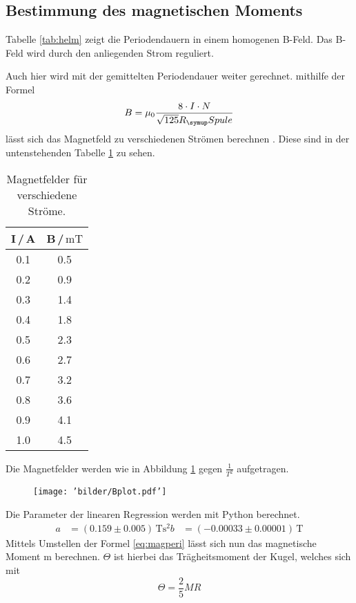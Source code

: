 \subsection{Bestimmung des magnetischen Moments}
Tabelle \ref{tab:helm} zeigt die Periodendauern in einem homogenen B-Feld. Das
B-Feld wird durch den anliegenden Strom reguliert.

Auch hier wird mit der gemittelten Periodendauer weiter gerechnet.
mithilfe der Formel
\begin{equation*}
  B=\mu_0\frac{8\cdot I\cdot N}{\sqrt{125}R_\su{Spule}}
\end{equation*}
lässt sich das Magnetfeld zu verschiedenen Strömen berechnen \cite{bfeld}.
Diese sind in der untenstehenden Tabelle \ref{tab:bfeld} zu sehen.
\begin{table}
  \centering
  \begin{tabular}{c c}
    \toprule
    I\,/\,A & B\,/\,$\si{\milli\tesla}$\\
    \midrule
    0.1 &  0.5 \\
    0.2 &  0.9 \\
    0.3 &  1.4 \\
    0.4 &  1.8 \\
    0.5 &  2.3 \\
    0.6 &  2.7 \\
    0.7 &  3.2 \\
    0.8 &  3.6 \\
    0.9 &  4.1 \\
    1.0 &  4.5 \\
    \bottomrule
  \end{tabular}
  \caption{Magnetfelder für verschiedene Ströme.}
  \label{tab:bfeld}
\end{table}
Die Magnetfelder werden wie in Abbildung \ref{fig:Bplot} gegen $\frac{1}{T^2}$
aufgetragen.
\begin{figure}
  \texttt{[image: 'bilder/Bplot.pdf']}
  \caption{}
  \label{fig:Bplot}
\end{figure}
Die Parameter der linearen Regression werden mit Python berechnet.
\begin{align*}
  a &= (0.159   \pm 0.005 )\,\si{\tesla\square\second}
  b &= (-0.00033 \pm 0.00001)\,\si{\tesla}
\end{align*}
Mittels Umstellen der Formel \eqref{eq:magperi} lässt sich nun das magnetische
Moment m berechnen. $\Theta$ ist hierbei das Trägheitsmoment der Kugel, welches
sich mit
\begin{equation*}
  \Theta = \frac{2}{5}MR
\end{equation*}

